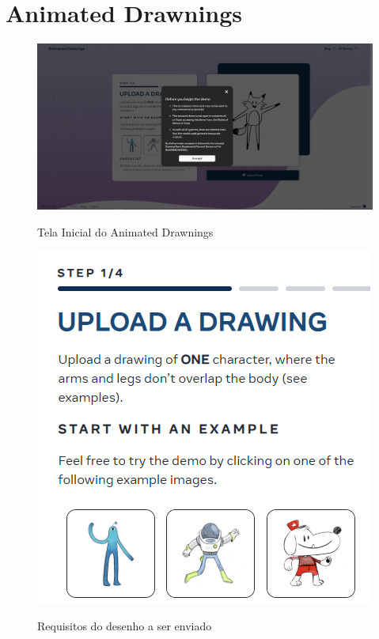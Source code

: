 \FloatBarrier
\section{Animated Drawnings}
\label{s.sketchApendice}

\begin{figure}[htbp]
    \centering
    \caption{Tela Inicial do Animated Drawnings}
    \includegraphics[width=1\linewidth]{figs/sketchLab/telaInicial.PNG}
    \label{fig:sketchInicial}
\end{figure}

\begin{figure}[htbp]
    \centering
    \caption{Requisitos do desenho a ser enviado}
    \includegraphics[width=0.5\linewidth]{figs/sketchLab/semSobreposicao.PNG}
    \label{fig:sketchSobreposicao}
\end{figure}

